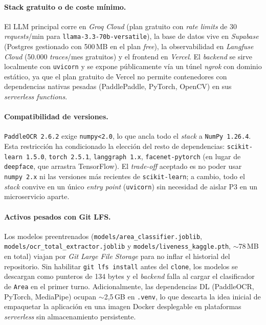 \paragraph{Stack gratuito o de coste mínimo.} El LLM principal corre
en \textit{Groq Cloud} (plan gratuito con \textit{rate limits} de
30 \textit{requests}/min para \texttt{llama-3.3-70b-versatile}), la
base de datos vive en \textit{Supabase} (Postgres gestionado con
500\,MB en el plan \textit{free}), la observabilidad en
\textit{Langfuse Cloud} (50.000 \textit{traces}/mes gratuitos) y el
frontend en \textit{Vercel}. El \textit{backend} se sirve localmente
con \texttt{uvicorn} y se expone públicamente vía un túnel
\textit{ngrok} con dominio estático, ya que el plan gratuito de
Vercel no permite contenedores con dependencias nativas pesadas
(PaddlePaddle, PyTorch, OpenCV) en sus \textit{serverless functions}.

\paragraph{Compatibilidad de versiones.} \texttt{PaddleOCR 2.6.2}
exige \texttt{numpy<2.0}, lo que ancla todo el \textit{stack} a
\texttt{NumPy 1.26.4}. Esta restricción ha condicionado la elección del
resto de dependencias: \texttt{scikit-learn 1.5.0},
\texttt{torch 2.5.1}, \texttt{langgraph 1.x},
\texttt{facenet-pytorch} (en lugar de \texttt{deepface}, que arrastra
TensorFlow). El \textit{trade-off} aceptado es no poder usar
\texttt{numpy 2.x} ni las versiones más recientes de
\texttt{scikit-learn}; a cambio, todo el \textit{stack} convive en
un único \textit{entry point} (\texttt{uvicorn}) sin necesidad de
aislar P3 en un microservicio aparte.

\paragraph{Activos pesados con Git LFS.} Los modelos preentrenados
(\texttt{models/area\_classifier.joblib},
\texttt{models/ocr\_total\_extractor.joblib} y
\texttt{models/liveness\_kaggle.pth}, $\sim$78\,MB en total) viajan
por \textit{Git Large File Storage} para no inflar el historial del
repositorio. Sin habilitar \texttt{git lfs install} antes del
\texttt{clone}, los modelos se descargan como punteros de 134 bytes
y el \textit{backend} falla al cargar el clasificador de
\texttt{Area} en el primer turno. Adicionalmente, las dependencias
DL (PaddleOCR, PyTorch, MediaPipe) ocupan $\sim$2{,}5\,GB en
\texttt{.venv}, lo que descarta la idea inicial de empaquetar la
aplicación en una imagen Docker desplegable en plataformas
\textit{serverless} sin almacenamiento persistente.

